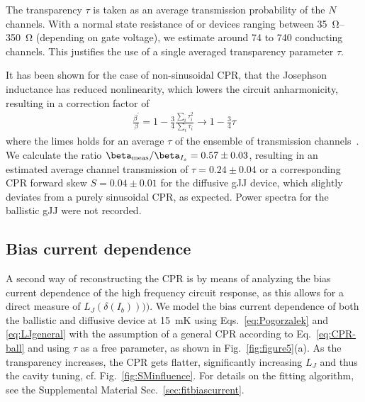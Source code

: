 The transparency $\tau$ is taken as an average transmission probability of the $N$ channels.
%
With a normal state resistance of or devices ranging between \SIrange{35}{350}{\ohm} (depending on gate voltage), we estimate around 74 to 740 conducting channels.
%
This justifies the use of a single averaged transparency parameter $\tau$.

It has been shown for the case of non-sinusoidal CPR, that the Josephson inductance has reduced nonlinearity, which lowers the circuit anharmonicity, resulting in a correction factor of
\begin{align}
\frac{\beta^\prime}{\beta} =  1-\frac{3}{4}\frac{\sum_i\tau_i^2}{\sum_i\tau_i} \rightarrow 1-\frac{3}{4}\tau 
\label{eq:anh_nonsin}
\end{align}
%
where the limes holds for an average $\tau$ of the ensemble of transmission channels~\cite{kringhojAnharmonicitySuperconductingQubit2018}.
%
We calculate the ratio $\beta_{\rm meas}/\beta_{I_s}=0.57\pm0.03$, resulting in an estimated average channel transmission of $\tau=0.24\pm0.04$ or a corresponding CPR forward skew $S = 0.04\pm0.01$ for the diffusive gJJ device, which slightly deviates from a purely sinusoidal CPR, as expected.
%
Power spectra for the ballistic gJJ were not recorded.


\subsection{Bias current dependence}

A second way of reconstructing the CPR is by means of analyzing the bias current dependence of the high frequency circuit response, as this allows for a direct measure of $L_J(\delta(I_b))))$.
%
We model the bias current dependence of both the ballistic and diffusive device at \SI{15}{\milli\kelvin} using Eqs.~\ref{eq:Pogorzalek} and \ref{eq:LJgeneral} with the assumption of a general CPR according to Eq.~\ref{eq:CPR-ball} and using $\tau$ as a free parameter, as shown in Fig.~\ref{fig:figure5}(a).
%
As the transparency increases, the CPR gets flatter, significantly increasing $L_J$ and thus the cavity tuning, cf. Fig.~\ref{fig:SMinfluence}.
%
For details on the fitting algorithm, see the Supplemental Material Sec.~\ref{sec:fitbiascurrent}.

